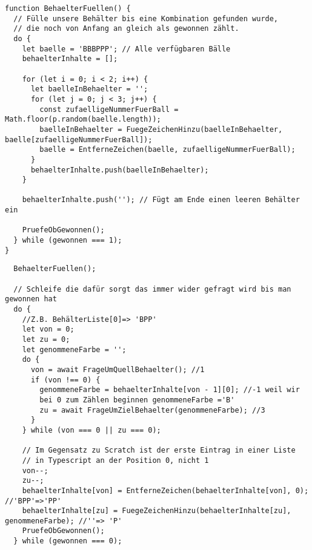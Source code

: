 \documentclass{article}
\begin{document}
        \begin{tcolorbox}[colback=gray!30, colframe=white]
        \begin{verbatim}
function BehaelterFuellen() {
  // Fülle unsere Behälter bis eine Kombination gefunden wurde,
  // die noch von Anfang an gleich als gewonnen zählt.
  do {
    let baelle = 'BBBPPP'; // Alle verfügbaren Bälle
    behaelterInhalte = [];

    for (let i = 0; i < 2; i++) {
      let baelleInBehaelter = '';
      for (let j = 0; j < 3; j++) {
        const zufaelligeNummerFuerBall = Math.floor(p.random(baelle.length));
        baelleInBehaelter = FuegeZeichenHinzu(baelleInBehaelter, baelle[zufaelligeNummerFuerBall]);
        baelle = EntferneZeichen(baelle, zufaelligeNummerFuerBall);
      }
      behaelterInhalte.push(baelleInBehaelter);
    }

    behaelterInhalte.push(''); // Fügt am Ende einen leeren Behälter ein

    PruefeObGewonnen();
  } while (gewonnen === 1);
}
\end{verbatim}
    \end{tcolorbox}

            \begin{tcolorbox}[colback=gray!30, colframe=white]
        \begin{verbatim}
  BehaelterFuellen();

  // Schleife die dafür sorgt das immer wider gefragt wird bis man gewonnen hat
  do {
    //Z.B. BehälterListe[0]=> 'BPP'
    let von = 0;
    let zu = 0;
    let genommeneFarbe = '';
    do {
      von = await FrageUmQuellBehaelter(); //1
      if (von !== 0) {
        genommeneFarbe = behaelterInhalte[von - 1][0]; //-1 weil wir
        bei 0 zum Zählen beginnen genommeneFarbe ='B'
        zu = await FrageUmZielBehaelter(genommeneFarbe); //3
      }
    } while (von === 0 || zu === 0);

    // Im Gegensatz zu Scratch ist der erste Eintrag in einer Liste
    // in Typescript an der Position 0, nicht 1
    von--;
    zu--;
    behaelterInhalte[von] = EntferneZeichen(behaelterInhalte[von], 0); //'BPP'=>'PP'
    behaelterInhalte[zu] = FuegeZeichenHinzu(behaelterInhalte[zu], genommeneFarbe); //''=> 'P'
    PruefeObGewonnen();
  } while (gewonnen === 0);
\end{verbatim}
    \end{tcolorbox}
\end{document}
